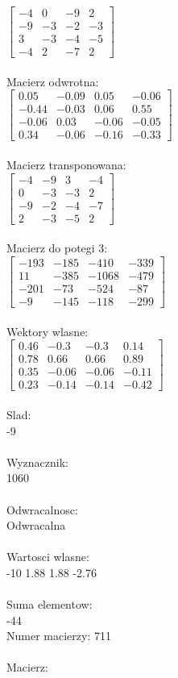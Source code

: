 \documentclass[a4paper,12pt]{article}
\begin{document}
$\begin{bmatrix} -4&0&-9&2\\-9&-3&-2&-3\\3&-3&-4&-5\\-4&2&-7&2 \end{bmatrix}$
\\
\\
Macierz odwrotna:\\

$\begin{bmatrix} 0.05&-0.09&0.05&-0.06\\-0.44&-0.03&0.06&0.55\\-0.06&0.03&-0.06&-0.05\\0.34&-0.06&-0.16&-0.33 \end{bmatrix}$
\\
\\
Macierz transponowana:\\

$\begin{bmatrix} -4&-9&3&-4\\0&-3&-3&2\\-9&-2&-4&-7\\2&-3&-5&2 \end{bmatrix}$
\\
\\
Macierz do potegi 3:\\

$\begin{bmatrix} -193&-185&-410&-339\\11&-385&-1068&-479\\-201&-73&-524&-87\\-9&-145&-118&-299 \end{bmatrix}$
\\
\\
Wektory wlasne:\\

$\begin{bmatrix} 0.46&-0.3&-0.3&0.14\\0.78&0.66&0.66&0.89\\0.35&-0.06&-0.06&-0.11\\0.23&-0.14&-0.14&-0.42 \end{bmatrix}$
\\
\\
Slad:\\
-9
\\
\\
Wyznacznik:\\
1060
\\
\\
Odwracalnosc:\\
Odwracalna
\\
\\
Wartosci wlasne:\\
-10 1.88 1.88 -2.76
\\
\\
Suma elementow:\\
-44
\\
\newpage
Numer macierzy:
711
\\
\\
Macierz:\\
\end{document}
